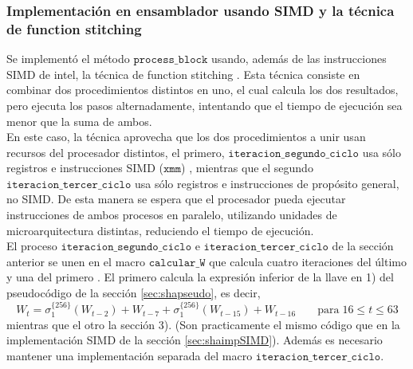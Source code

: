 \subsubsection{Implementación en ensamblador usando SIMD y la técnica de function stitching}
Se implementó el método $\texttt{process\_block}$ usando, además de las instrucciones SIMD de intel, la técnica de function stitching \cite{ShaSIMD1}. Esta técnica consiste en combinar dos procedimientos distintos en uno, el cual calcula los dos resultados, pero ejecuta los pasos alternadamente, intentando que el tiempo de ejecución sea menor que la suma de ambos. \\
\indent En este caso, la técnica aprovecha que los dos procedimientos a unir usan recursos del procesador distintos, el primero, $\texttt{iteracion\_segundo\_ciclo}$ usa sólo registros e instrucciones SIMD ($\texttt{xmm}$) , mientras que el segundo \\ $\texttt{iteracion\_tercer\_ciclo}$ usa sólo registros e instrucciones de propósito general, no SIMD. De esta manera se espera que el procesador pueda ejecutar instrucciones de ambos procesos en paralelo, utilizando unidades de microarquitectura distintas, reduciendo el tiempo de ejecución.\\
\indent El proceso $\texttt{iteracion\_segundo\_ciclo}$ e $\texttt{iteracion\_tercer\_ciclo}$ de la sección anterior se unen en el macro $\texttt{calcular\_W}$ que calcula cuatro iteraciones del último y una del primero . El primero calcula la expresión inferior de la llave en 1) del pseudocódigo de la sección \ref{sec:shapseudo}, es decir, 
$$W_t = \sigma_1^{\{256\}}(W_{t-2}) + W_{t-7} + \sigma_1^{\{256\}}(W_{t-15}) + W_{t-16} \; \; \; \; \; \; \; \text{para} \; 16 \leq t \leq 63  $$ 
mientras que el otro la sección 3). (Son practicamente el mismo código que en la implementación SIMD de la sección \ref{sec:shaimpSIMD}). Además es necesario mantener una implementación separada del macro $\texttt{iteracion\_tercer\_ciclo}$. \\

